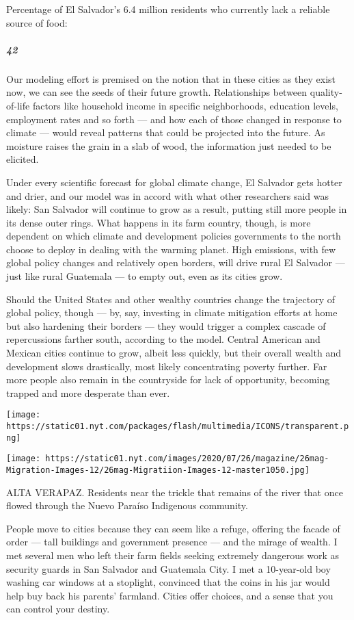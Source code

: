 Percentage of El Salvador's 6.4 million residents who currently lack a
reliable source of food:

\hypertarget{42}{%
\subparagraph{42}\label{42}}

Our modeling effort is premised on the notion that in these cities as
they exist now, we can see the seeds of their future growth.
Relationships between quality-of-life factors like household income in
specific neighborhoods, education levels, employment rates and so forth
--- and how each of those changed in response to climate --- would
reveal patterns that could be projected into the future. As moisture
raises the grain in a slab of wood, the information just needed to be
elicited.

Under every scientific forecast for global climate change, El Salvador
gets hotter and drier, and our model was in accord with what other
researchers said was likely: San Salvador will continue to grow as a
result, putting still more people in its dense outer rings. What happens
in its farm country, though, is more dependent on which climate and
development policies governments to the north choose to deploy in
dealing with the warming planet. High emissions, with few global policy
changes and relatively open borders, will drive rural El Salvador ---
just like rural Guatemala --- to empty out, even as its cities grow.

Should the United States and other wealthy countries change the
trajectory of global policy, though --- by, say, investing in climate
mitigation efforts at home but also hardening their borders --- they
would trigger a complex cascade of repercussions farther south,
according to the model. Central American and Mexican cities continue to
grow, albeit less quickly, but their overall wealth and development
slows drastically, most likely concentrating poverty further. Far more
people also remain in the countryside for lack of opportunity, becoming
trapped and more desperate than ever.

\texttt{[image: https://static01.nyt.com/packages/flash/multimedia/ICONS/transparent.png]}

\texttt{[image: https://static01.nyt.com/images/2020/07/26/magazine/26mag-Migration-Images-12/26mag-Migratiion-Images-12-master1050.jpg]}

ALTA VERAPAZ. Residents near the trickle that remains of the river that
once flowed through the Nuevo Paraíso Indigenous community.

People move to cities because they can seem like a refuge, offering the
facade of order --- tall buildings and government presence --- and the
mirage of wealth. I met several men who left their farm fields seeking
extremely dangerous work as security guards in San Salvador and
Guatemala City. I met a 10-year-old boy washing car windows at a
stoplight, convinced that the coins in his jar would help buy back his
parents' farmland. Cities offer choices, and a sense that you can
control your destiny.

